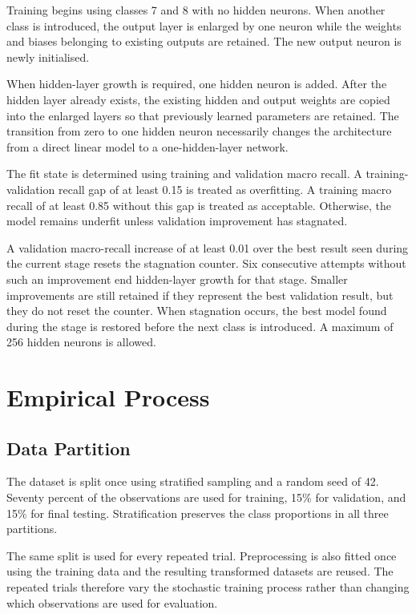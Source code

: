 \documentclass[conference]{IEEEtran}
\begin{document}
Training begins using classes 7 and 8 with no hidden neurons. When another class is introduced, the output layer is enlarged by one neuron while the weights and biases belonging to existing outputs are retained. The new output neuron is newly initialised.

When hidden-layer growth is required, one hidden neuron is added. After the hidden layer already exists, the existing hidden and output weights are copied into the enlarged layers so that previously learned parameters are retained. The transition from zero to one hidden neuron necessarily changes the architecture from a direct linear model to a one-hidden-layer network.

The fit state is determined using training and validation macro recall. A training-validation recall gap of at least 0.15 is treated as overfitting. A training macro recall of at least 0.85 without this gap is treated as acceptable. Otherwise, the model remains underfit unless validation improvement has stagnated.

A validation macro-recall increase of at least 0.01 over the best result seen during the current stage resets the stagnation counter. Six consecutive attempts without such an improvement end hidden-layer growth for that stage. Smaller improvements are still retained if they represent the best validation result, but they do not reset the counter. When stagnation occurs, the best model found during the stage is restored before the next class is introduced. A maximum of 256 hidden neurons is allowed.

\section{Empirical Process}

\subsection{Data Partition}

The dataset is split once using stratified sampling and a random seed of 42. Seventy percent of the observations are used for training, 15\% for validation, and 15\% for final testing. Stratification preserves the class proportions in all three partitions.

The same split is used for every repeated trial. Preprocessing is also fitted once using the training data and the resulting transformed datasets are reused. The repeated trials therefore vary the stochastic training process rather than changing which observations are used for evaluation.
\end{document}
